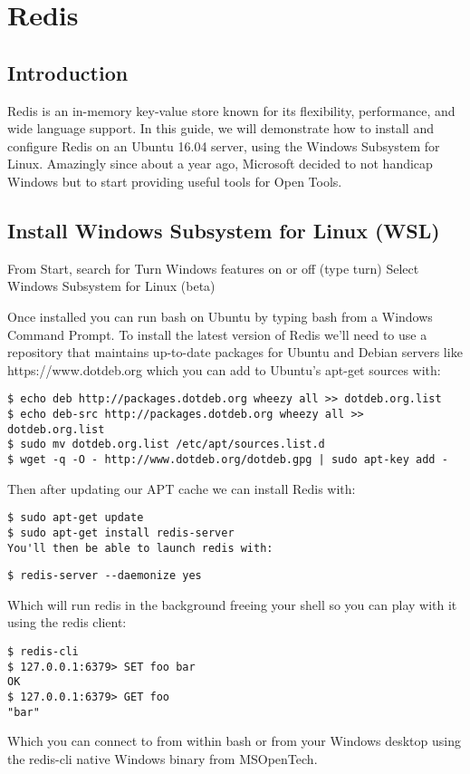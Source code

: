 \chapter{Redis}

\section{Introduction}

Redis is an in-memory key-value store known for its flexibility, performance, and wide language support. In this guide, we will demonstrate how to install and configure Redis on an Ubuntu 16.04 server, using the Windows Subsystem for Linux. Amazingly since about a year ago, Microsoft decided to not handicap Windows but to start providing useful tools for Open Tools.


\section{Install Windows Subsystem for Linux (WSL)}


From Start, search for Turn Windows features on or off (type turn)
Select Windows Subsystem for Linux (beta)


Once installed you can run bash on Ubuntu by typing bash from a Windows Command Prompt. To install the latest version of Redis we'll need to use a repository that maintains up-to-date packages for Ubuntu and Debian servers like https://www.dotdeb.org which you can add to Ubuntu's apt-get sources with:


\begin{verbatim}
$ echo deb http://packages.dotdeb.org wheezy all >> dotdeb.org.list
$ echo deb-src http://packages.dotdeb.org wheezy all >> dotdeb.org.list
$ sudo mv dotdeb.org.list /etc/apt/sources.list.d
$ wget -q -O - http://www.dotdeb.org/dotdeb.gpg | sudo apt-key add -
\end{verbatim}

Then after updating our APT cache we can install Redis with:

\begin{verbatim}
$ sudo apt-get update
$ sudo apt-get install redis-server
You'll then be able to launch redis with:
\end{verbatim}


\begin{verbatim}
$ redis-server --daemonize yes
\end{verbatim}

Which will run redis in the background freeing your shell so you can play with it using the redis client:

\begin{verbatim}
$ redis-cli
$ 127.0.0.1:6379> SET foo bar
OK
$ 127.0.0.1:6379> GET foo
"bar"
\end{verbatim}

Which you can connect to from within bash or from your Windows desktop using the redis-cli native Windows binary from MSOpenTech.